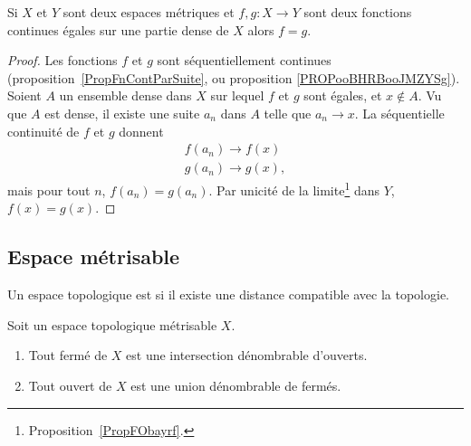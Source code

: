 \begin{proposition} \label{PropCJGIooZNpnGF}
	Si \( X\) et \( Y\) sont deux espaces métriques et \( f,g\colon X\to Y\) sont deux fonctions continues égales sur une partie dense de \( X\) alors \( f=g\).
\end{proposition}

\begin{proof}
	Les fonctions \( f\) et \( g\) sont séquentiellement continues (proposition~\ref{PropFnContParSuite}, ou proposition \ref{PROPooBHRBooJMZYSg}). Soient \( A\) un ensemble dense dans \( X\) sur lequel \( f\) et \( g\) sont égales, et \( x\notin A\). Vu que \( A\) est dense, il existe une suite \( a_n\) dans \( A\) telle que \( a_n\to x\). La séquentielle continuité de \( f\) et \( g\) donnent
	\begin{subequations}
		\begin{align}
			f(a_n)\to f(x) \\
			g(a_n)\to g(x),
		\end{align}
	\end{subequations}
	mais pour tout \( n\), \( f(a_n)=g(a_n)\). Par unicité de la limite\footnote{Proposition~\ref{PropFObayrf}.} dans \( Y\), \( f(x)=g(x)\).
\end{proof}

\subsection{Espace métrisable}

\begin{definition}		\label{DEFooGLTUooJjaSmI}
	Un espace topologique est  si il existe une distance compatible avec la topologie.
\end{definition}

\begin{proposition}      \label{PROPooXWBTooCvGLOj}
	Soit un espace topologique métrisable \( X\).
	\begin{enumerate}
		\item   \label{ITEMooOXVRooBsKwuq}
		      Tout fermé de \( X\) est une intersection dénombrable d'ouverts.
		\item
		      Tout ouvert de \( X\) est une union dénombrable de fermés.
	\end{enumerate}
\end{proposition}

